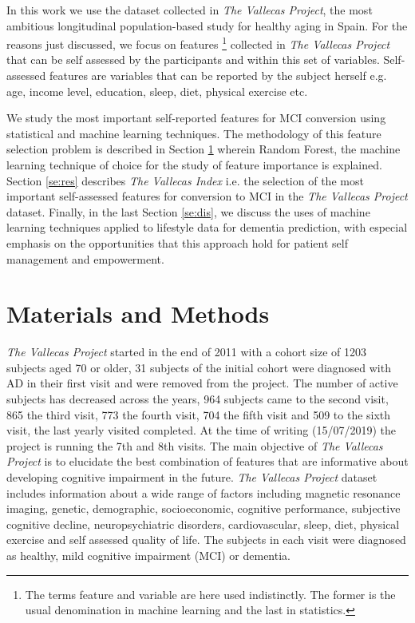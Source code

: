 \documentclass[preprint,12pt]{elsarticle}
\begin{document}
In this work we use the dataset collected in \emph{The Vallecas Project}, the most ambitious longitudinal population-based study for healthy aging in Spain. For the reasons just discussed, we focus on features \footnote{The terms feature and variable are here used indistinctly. The former is the usual denomination in  machine learning and the last in statistics.} collected in \emph{The Vallecas Project} that can be self assessed by the participants and within this set of variables. Self-assessed features are variables that can be reported by the subject herself e.g. age, income level, education, sleep, diet, physical exercise etc.

We study the most important self-reported features for MCI conversion using statistical and machine learning techniques. The methodology of this feature selection problem is described in Section \ref{se:mandm} wherein Random Forest, the machine learning technique of choice for the study of feature importance is explained.
Section \ref{se:res} describes \emph{The Vallecas Index} i.e. the selection of the most important self-assessed features for conversion to MCI in the \emph{The Vallecas Project} dataset. Finally, in the last Section \ref{se:dis}, we discuss the uses of machine learning techniques applied to lifestyle data for dementia prediction, with especial emphasis on the opportunities that this approach hold for patient self management and empowerment. 

\section{Materials and Methods}
\label{se:mandm}

\emph{The Vallecas Project} started in the end of 2011 with a cohort size of 1203 subjects aged 70 or older, 31 subjects of the initial cohort were diagnosed with AD in their first visit and were removed from the project. The number of active subjects has decreased across the years, 964 subjects came to the second visit, 865 the third visit, 773 the fourth visit, 704 the fifth visit and 509 to the sixth visit, the last yearly visited completed. At the time of writing (15/07/2019) the project is running the 7th and 8th visits.
The main objective of \emph{The Vallecas Project} is to elucidate the best combination of features  that are informative about developing cognitive impairment in the future. 
\emph{The Vallecas Project} dataset includes information about a wide range of factors including magnetic resonance imaging, genetic, demographic, socioeconomic, cognitive performance, subjective cognitive decline, neuropsychiatric disorders, cardiovascular, sleep, diet, physical exercise and self assessed quality of life. The subjects in each visit were diagnosed as healthy, mild cognitive impairment (MCI) or dementia.
\end{document}
